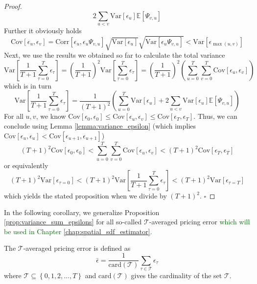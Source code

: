 \begin{proof}
\[	2 \sum_{u<v} \mathrm{Var} \left[ \epsilon_{u} \right] \mathbb{E} \left[ \Psi_{v,u} \right]
	\]
	Further it obviously holds
	\[
	\mathrm{Cov} \left[  \epsilon_{u}, \epsilon_{v} \right] =
	\mathrm{Corr} \left[  \epsilon_{u}, \epsilon_{u} \Psi_{v,u} \right]
	\sqrt{\mathrm{Var} \left[  \epsilon_{u} \right]}
	\sqrt{\mathrm{Var} \left[  \epsilon_{u} \Psi_{v,u} \right]}
	< 
	\mathrm{Var} \left[  \epsilon_{\max \left( u, v \right)} \right]
	\]
	Next, we use the results we obtained so far to calculate the total variance
	\[
	\mathrm{Var} \left[ \frac{1}{T+1} \sum_{\tau=0}^T \epsilon_{\tau} \right]
	=
	\left( \frac{1}{T+1} \right)^2 	
	\mathrm{Var} \left[ \sum_{\tau=0}^T \epsilon_{\tau} \right]
	=
	\left( \frac{1}{T+1} \right)^2 
	\left( 
	\sum_{u=0}^T \sum_{v=0}^T \mathrm{Cov} \left[  \epsilon_{u}, \epsilon_{v} \right]
	\right)
	\]
	which is in turn
	\[
	\mathrm{Var} \left[ \frac{1}{T+1} \sum_{\tau=0}^T \epsilon_{\tau} \right]
	=
	\frac{1}{\left( T + 1 \right)^2}
	\left(
	\sum_{u=0}^T \mathrm{Var} \left[  \epsilon_{u} \right] + 
	2 \sum_{u<v} \mathrm{Var} \left[ \epsilon_{u} \right] \mathbb{E} \left[ \Psi_{v,u} \right]
	\right)
	\]
	For all $u,v$, we know $\mathrm{Cov} \left[  \epsilon_{0}, \epsilon_{0} \right] \leq \mathrm{Cov} \left[  \epsilon_{u}, \epsilon_{v} \right] \leq \mathrm{Cov} \left[  \epsilon_{T}, \epsilon_{T} \right]$.
	Thus, we can conclude using Lemma \ref{lemma:variance_epsilon} (which implies $\mathrm{Cov} \left[  \epsilon_{u}, \epsilon_{u} \right]<\mathrm{Cov} \left[  \epsilon_{u+1}, \epsilon_{u+1} \right]$)
	\[
	\left( T + 1 \right)^2
	\mathrm{Cov} \left[  \epsilon_{0}, \epsilon_{0} \right]
	<
	\sum_{u=0}^T \sum_{v=0}^T \mathrm{Cov} \left[  \epsilon_{u}, \epsilon_{v} \right]
	<
	\left( T + 1 \right)^2
	\mathrm{Cov} \left[  \epsilon_{T}, \epsilon_{T} \right]
	\]
	or equivalently
	\[
	\left( T + 1 \right)^2
	\mathrm{Var} \left[ \epsilon_{\tau=0} \right] <
	\left( T + 1 \right)^2
	\mathrm{Var} \left[ \frac{1}{T+1} \sum_{\tau=0}^T \epsilon_{\tau} \right] <
	\left( T + 1 \right)^2
	\mathrm{Var} \left[ \epsilon_{\tau=T} \right]
	\]
	which yields the stated proposition when we divide by $\left( T + 1 \right)^2$.
	$\square$
\end{proof}

In the following corollary, we generalize Proposition \ref{prop:variance_sum_epsilons} for all so-called $\mathcal{T}$-averaged pricing error \textcolor{darkgreen}{which will be used in Chapter \ref{chap:spatial_sdf_estimator}.}

\begin{definition}
	\label{def:tau_averaged_pricing_error}
	The $\mathcal{T}$-averaged pricing error is defined as
	\[
	\bar{\epsilon} = \frac{1}{\mathrm{card}(\mathcal{T})} \sum_{\tau \in \mathcal{T}} \epsilon_{\tau}
	\]
	where $\mathcal{T} \subseteq \left\{0,1,2,\dots,T \right\}$ and $\mathrm{card}(\mathcal{T})$ gives the cardinality of the set $\mathcal{T}$.
\end{definition}


